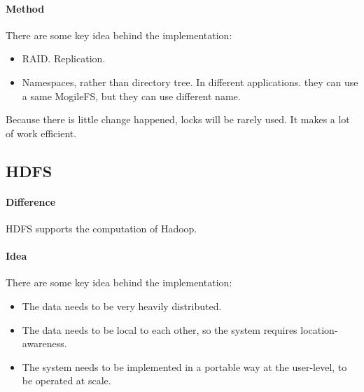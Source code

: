\paragraph{Method}
There are some key idea behind the implementation:
\begin{itemize}
    \item RAID. Replication.
    \item Namespaces, rather than directory tree. In different applications. they can use a same MogileFS, but they can use different name.
\end{itemize}
Because there is little change happened, locks will be rarely used. It makes a lot of work efficient.

\subsection{HDFS}
\paragraph{Difference}
HDFS supports the computation of Hadoop.
 
\paragraph{Idea}
There are some key idea behind the implementation:
\begin{itemize}
    \item The data needs to be very heavily distributed.
    \item The data needs to be local to each other, so the system requires location-awareness. 
    \item The system needs to be implemented in a portable way at the user-level, to be operated at scale.
\end{itemize}




